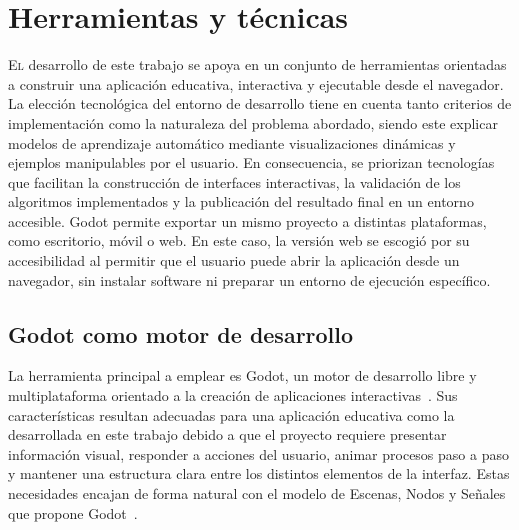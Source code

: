 \chapter{Herramientas y técnicas}
\label{chap:herramientas_y_tecnicas}

\lettrine{E}{l} desarrollo de este trabajo se apoya en un conjunto de herramientas orientadas a construir una aplicación educativa, interactiva y ejecutable desde el navegador.
La elección tecnológica del entorno de desarrollo tiene en cuenta tanto criterios de implementación como la naturaleza del problema abordado, siendo este explicar modelos de aprendizaje automático mediante visualizaciones dinámicas y ejemplos manipulables por el usuario.
En consecuencia, se priorizan tecnologías que facilitan la construcción de interfaces interactivas, la validación de los algoritmos implementados y la publicación del resultado final en un entorno accesible.
Godot permite exportar un mismo proyecto a distintas plataformas, como escritorio, móvil o web.
En este caso, la versión web se escogió por su accesibilidad al permitir que el usuario puede abrir la aplicación desde un navegador, sin instalar software ni preparar un entorno de ejecución específico.

\section{Godot como motor de desarrollo}
\label{sec:herramientas_godot}

La herramienta principal a emplear es Godot, un motor de desarrollo libre y multiplataforma orientado a la creación de aplicaciones interactivas~\cite{GodotEngine}.
Sus características resultan adecuadas para una aplicación educativa como la desarrollada en este trabajo debido a que
el proyecto requiere presentar información visual, responder a acciones del usuario, animar procesos paso a paso y mantener una estructura clara entre los distintos elementos de la interfaz.
Estas necesidades encajan de forma natural con el modelo de \gls{Escena}s, \gls{Nodo}s y Señales que propone Godot~\cite{GodotDocs}.

